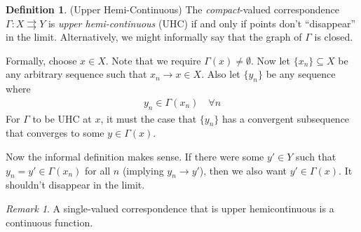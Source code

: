 \documentclass[12pt]{book}
\numberwithin{equation}{section} %
\theoremstyle{plain}
\theoremstyle{definition}
\newtheorem{defn}[thm]{Definition}
\theoremstyle{remark}
\newtheorem*{rmk}{Remark}
\newcommand{\ra}{\rightarrow}
\begin{document}







\begin{defn}{(Upper Hemi-Continuous)}
The \emph{compact}-valued correspondence $\Gamma:X\rightrightarrows Y$
is \emph{upper hemi-continuous} (UHC) if and only if points don't
``disappear'' in the limit. Alternatively, we might informally say that
the graph of $\Gamma$ is closed.

Formally, choose $x\in X$. Note that we require
$\Gamma(x)\neq\emptyset$. Now let $\{x_n\}\subseteq X$ be any arbitrary
sequence such that $x_n\ra x\in X$. Also let $\{y_n\}$ be any sequence
where
\begin{align*}
  y_n \in \Gamma(x_n) \quad\forall n
\end{align*}
For $\Gamma$ to be UHC at $x$, it must the case that $\{y_n\}$ has a
convergent subsequence that converges to some $y\in \Gamma(x)$.

Now the informal definition makes sense. If there were some $y'\in Y$
such that $y_n = y' \in \Gamma(x_n)$ for all $n$ (implying
$y_n\rightarrow y'$), then we also want $y'\in \Gamma(x)$. It shouldn't
disappear in the limit.
\end{defn}
\begin{rmk}
A single-valued correspondence that is upper hemicontinuous is a
continuous function.
\end{rmk}
\end{document}
